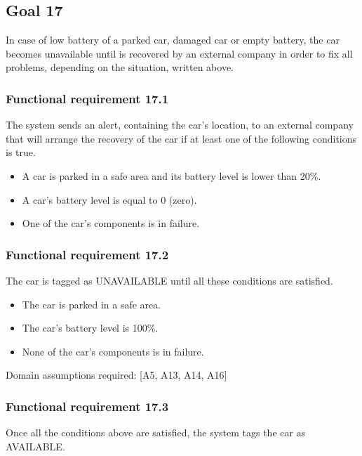 \subsection{Goal 17}
In case of low battery of a parked car, damaged car or empty battery, the car becomes unavailable until is recovered by an external company in order to fix all problems, depending on the situation, written above. 

\setcounter{secnumdepth}{3}
\subsubsection{Functional requirement 17.1}
The system sends an alert, containing the car's location, to an external company that will arrange the recovery of the car if at least one of the following conditions is true.

\begin{itemize}
	\item A car is parked in a safe area and its battery level is lower than 20\%.
	\item A car's battery level is equal to 0 (zero).
	\item One of the car's components is in failure.
\end{itemize}

\subsubsection{Functional requirement 17.2}
The car is tagged as UNAVAILABLE until all these conditions are satisfied.

\begin{itemize}
	\item The car is parked in a safe area.
	\item The car's battery level is 100\%.
	\item None of the car's components is in failure.
\end{itemize}

\noindent Domain assumptions required: [A5, A13, A14, A16]

\subsubsection{Functional requirement 17.3}
Once all the conditions above are satisfied, the system tags the car as AVAILABLE.
